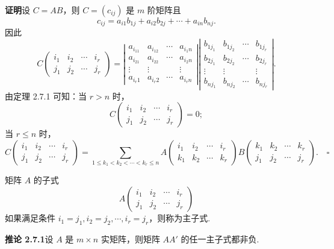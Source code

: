 \documentclass[UTF8,12pt,a4paper,fontset=fandol]{ctexart}
\begin{document}
\noindent\textbf{证明}\quad 设 $C=AB$，则 $C=(c_{ij})$ 是 $m$ 阶矩阵且
\[
c_{ij}=a_{i1}b_{1j}+a_{i2}b_{2j}+\cdots+a_{in}b_{nj}.
\]
因此
\[
C\left(\begin{array}{cccc}
i_1 & i_2 & \cdots & i_r\\
j_1 & j_2 & \cdots & j_r
\end{array}\right)=
\left|\begin{array}{cccc}
a_{i_11} & a_{i_12} & \cdots & a_{i_1n}\\
a_{i_21} & a_{i_22} & \cdots & a_{i_2n}\\
\vdots & \vdots & & \vdots\\
a_{i_r1} & a_{i_r2} & \cdots & a_{i_rn}
\end{array}\right|
\left|\begin{array}{cccc}
b_{1j_1} & b_{1j_2} & \cdots & b_{1j_r}\\
b_{2j_1} & b_{2j_2} & \cdots & b_{2j_r}\\
\vdots & \vdots & & \vdots\\
b_{nj_1} & b_{nj_2} & \cdots & b_{nj_r}
\end{array}\right|.
\]
由定理 2.7.1 可知：当 $r>n$ 时，
\[
C\left(\begin{array}{cccc}
i_1 & i_2 & \cdots & i_r\\
j_1 & j_2 & \cdots & j_r
\end{array}\right)=0;
\]
当 $r\leq n$ 时，
\[
C\left(\begin{array}{cccc}
i_1 & i_2 & \cdots & i_r\\
j_1 & j_2 & \cdots & j_r
\end{array}\right)
=\sum_{1\leq k_1<k_2<\cdots<k_r\leq n}
A\left(\begin{array}{cccc}
i_1 & i_2 & \cdots & i_r\\
k_1 & k_2 & \cdots & k_r
\end{array}\right)
B\left(\begin{array}{cccc}
k_1 & k_2 & \cdots & k_r\\
j_1 & j_2 & \cdots & j_r
\end{array}\right). \quad \square
\]

矩阵 $A$ 的子式
\[
A\left(\begin{array}{cccc}
i_1 & i_2 & \cdots & i_r\\
j_1 & j_2 & \cdots & j_r
\end{array}\right)
\]
如果满足条件 $i_1=j_1,i_2=j_2,\cdots,i_r=j_r$，则称为主子式.

\noindent\textbf{推论 2.7.1}\quad 设 $A$ 是 $m\times n$ 实矩阵，则矩阵 $AA'$ 的任一主子式都非负.
\end{document}
